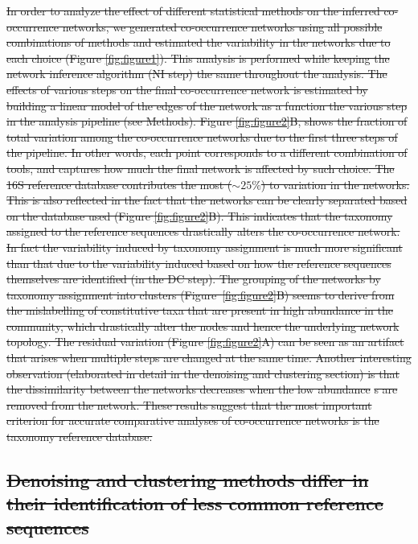 \documentclass[letterpaper,12pt]{article}
\providecommand{\DIFdeltex}[1]{{\protect\color{red}\sout{#1}}}                      %
\providecommand{\DIFdelbegin}{} %
\providecommand{\DIFdel}[1]{\texorpdfstring{\DIFdeltex{#1}}{}} %
\newcommand{\DIFscaledelfig}{0.5}
\newlength{\DIFdelgraphicswidth} %
\newlength{\DIFdelgraphicsheight} %
\newcommand{\DIFdelincludegraphics}[2][]{%
\sbox{\DIFdelgraphicsbox}{\DIFOincludegraphics[#1]{#2}}%
\settoboxwidth{\DIFdelgraphicswidth}{\DIFdelgraphicsbox} %
\settoboxtotalheight{\DIFdelgraphicsheight}{\DIFdelgraphicsbox} %
\scalebox{\DIFscaledelfig}{%
\parbox[b]{\DIFdelgraphicswidth}{\usebox{\DIFdelgraphicsbox}\\[-\baselineskip] \rule{\DIFdelgraphicswidth}{0em}}\llap{\resizebox{\DIFdelgraphicswidth}{\DIFdelgraphicsheight}{%
\setlength{\unitlength}{\DIFdelgraphicswidth}%
\begin{picture}(1,1)%
\thicklines\linethickness{2pt} %
{\color[rgb]{1,0,0}\put(0,0){\framebox(1,1){}}}%
{\color[rgb]{1,0,0}\put(0,0){\line( 1,1){1}}}%
{\color[rgb]{1,0,0}\put(0,1){\line(1,-1){1}}}%
\end{picture}%
}\hspace*{3pt}}} %
} %
\DeclareRobustCommand{\DIFdelbegin}{\DIFOdelbegin \let\includegraphics\DIFdelincludegraphics} %
\begin{document}
  \DIFdelbegin \DIFdel{In order to analyze the effect of different statistical methods on the inferred co-occurrence networks, we generated co-occurrence networks using all possible combinations of methods and estimated the variability in the networks due to each choice (Figure \ref{fig:figure1}).
  This analysis is performed while keeping the network inference algorithm (NI step) the same throughout the analysis.
  The effects of various steps on the final co-occurrence network is estimated by building a linear model of the edges of the network as a function the various step in the analysis pipeline (see Methods).
  Figure \ref{fig:figure2}B, shows the fraction of total variation among the co-occurrence networks due to the first three steps of the pipeline. In other words, each point corresponds to a different combination of tools, and captures how much the final network is affected by such choice.
  The 16S reference database contributes the most ($\sim25\%$) to variation in the networks. This is also reflected in the fact that the networks can be clearly separated based on the database used (Figure \ref{fig:figure2}B).
  This indicates that the taxonomy assigned to the reference sequences drastically alters the co-occurrence network.
  In fact the variability induced by taxonomy assignment is much more significant than that due to the variability induced based on how the reference sequences themselves are identified (in the DC step).
  The grouping of the networks by taxonomy assignment into clusters (Figure~\ref{fig:figure2}B) seems to derive from the mislabelling of constitutive taxa that are present in high abundance in the community, which drastically alter the nodes and hence the underlying network topology.
  The residual variation (Figure \ref{fig:figure2}A) can be seen as an artifact that arises when multiple steps are changed at the same time.
  Another interesting observation (elaborated in detail in the denoising and clustering section) is that the dissimilarity between the networks decreases when the low abundance }%
\DIFdel{s are removed from the network.
  These results suggest that the most important criterion for accurate comparative analyses of co-occurrence networks is the taxonomy reference database.
}%


\subsection*{\DIFdel{Denoising and clustering methods differ in their identification of less common reference sequences}}
\end{document}
